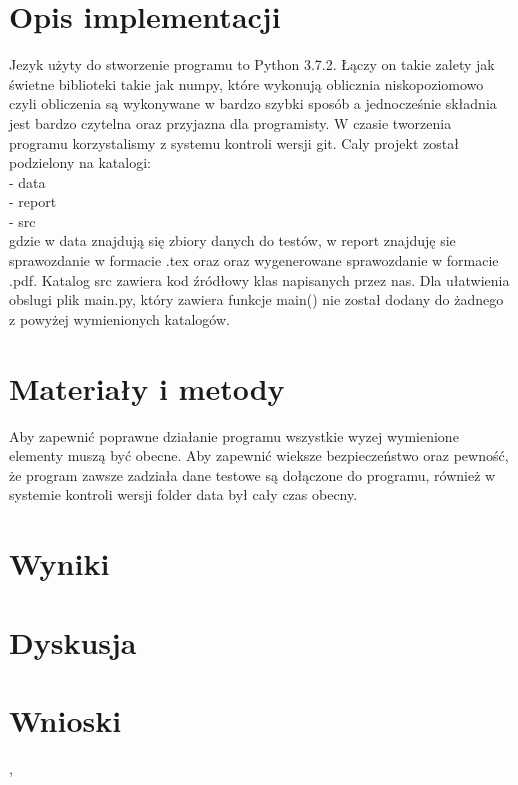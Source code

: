 \documentclass{classrep}
\begin{document}
\section{Opis implementacji}
{Jezyk użyty do stworzenie programu to Python 3.7.2. Łączy on takie zalety jak świetne biblioteki takie jak numpy, które wykonują oblicznia niskopoziomowo czyli obliczenia są wykonywane w bardzo szybki sposób a jednocześnie składnia jest bardzo czytelna oraz przyjazna dla programisty. W czasie tworzenia programu korzystalismy z systemu kontroli wersji git. Caly projekt został podzielony na katalogi:\\
- data\\
- report\\
- src\\
gdzie w data znajdują się zbiory danych do testów, w report znajduję sie sprawozdanie w formacie .tex oraz oraz wygenerowane sprawozdanie w formacie .pdf. Katalog src zawiera kod źródłowy klas napisanych przez nas. Dla ułatwienia obslugi plik main.py, który zawiera funkcje main() nie został dodany do żadnego z powyżej wymienionych katalogów.
}

\section{Materiały i metody}
{Aby zapewnić poprawne działanie programu wszystkie wyzej wymienione elementy muszą być obecne. Aby zapewnić wieksze bezpieczeństwo oraz pewność, że program zawsze zadziała dane testowe są dołączone do programu, również w systemie kontroli wersji folder data był cały czas obecny.
}

\section{Wyniki}
{

}

\section{Dyskusja}
{

}

\section{Wnioski}
{

}

\begin{thebibliography}{0}
    \textsl{ }, 

\end{thebibliography}

{

}
\end{document}
